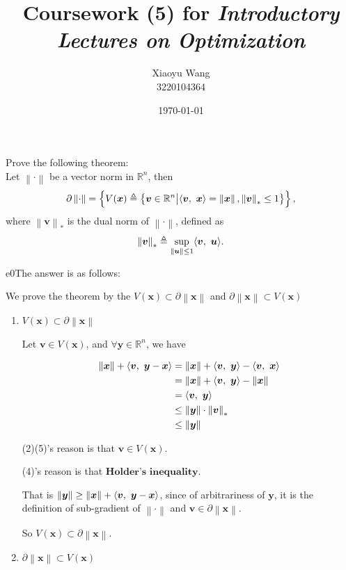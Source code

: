 \documentclass{article}
\title{Coursework (5) for \emph{Introductory Lectures on Optimization}}
\author{Xiaoyu Wang \\ 3220104364}
\date{\today}
\newcommand{\xB}{\bm{x}}
\newcommand{\yB}{\bm{y}}
\newcommand{\vB}{\bm{v}}
\newcommand{\uB}{\bm{u}}
\newcommand{\RBB}{\mathbb{R}}
\newcommand{\normgen}[1]{\left\| #1 \right\|}
\begin{document}
\maketitle

\begin{excercise}\label{e0}
Prove the following theorem: \\
Let $\normgen{\cdot}$ be a vector norm in $\RBB^n$,  then 
\[
\partial \normgen{\cdot} = \left\{ V(\xB) \triangleq \left\{  \vB \in \RBB^n \big| \innerproduct{\vB}{\xB} = \normgen{\xB}, \normgen{\vB}_* \leq 1  \right\} \right\},
\]
where $\normgen{\vB}_*$ is the dual norm of $\normgen{\cdot}$, defined as
\[
\normgen{\vB}_* \triangleq \sup_{ \normgen{\uB} \leq 1} \innerproduct{\vB}{\uB}.
\]	
\end{excercise}
\begin{PROOF}{e0}The answer is as follows:

	We prove the theorem by the $V(\xB)\subset\partial \normgen{\xB}$ and $\partial \normgen{\xB}\subset V(\xB)$ 

	\begin{enumerate}
		\item $V(\xB)\subset\partial \normgen{\xB}$
		
		Let $\vB \in V(\xB)$, and $\forall \yB \in \RBB^n$, we have

		\begin{align}
			\normgen{\xB} + \innerproduct{\vB}{\yB-\xB} &= \normgen{\xB} + \innerproduct{\vB}{\yB} - \innerproduct{\vB}{\xB} \\
			&= \normgen{\xB} + \innerproduct{\vB}{\yB} - \normgen{\xB} \\
			&= \innerproduct{\vB}{\yB} \\
			&\leq \normgen{\yB} \cdot \normgen{\vB}_*  \\
			&\leq \normgen{\yB}
		\end{align}

		(2)(5)'s reason is that $\vB \in V(\xB)$.

		(4)'s reason is that $\textbf{Holder's inequality}$.

		That is $\normgen{\yB}\geq \normgen{\xB} + \innerproduct{\vB}{\yB-\xB}$,
		since of arbitrariness of $\yB$, it is the definition of sub-gradient of 
		$\normgen{\cdot}$ and $\vB \in \partial \normgen{\xB}$.

		So $V(\xB)\subset\partial \normgen{\xB}$.
		\item $\partial \normgen{\xB}\subset V(\xB)$
		

\end{enumerate}
\end{PROOF}
\end{document}

